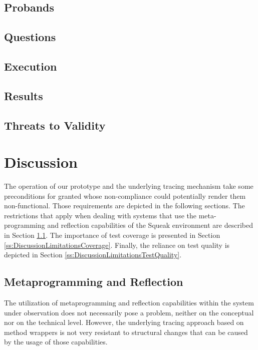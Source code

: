 \subsection{Probands}
\label{ss:DiscussionEvaluationParticipants}

\subsection{Questions}
\label{ss:DiscussionEvaluationQuestions}

\subsection{Execution}
\label{ss:DiscussionEvaluationExecution}

\subsection{Results}
\label{ss:DiscussionEvaluationResults}

\subsection{Threats to Validity}
\label{ss:DiscussionEvaluationThreats}

\clearpage
\section{Discussion}
\label{s:DiscussionLimitations}
The operation of our prototype and the underlying tracing mechanism take some preconditions for granted whose non-compliance could potentially render them non-functional.
Those requirements are depicted in the following sections.
The restrictions that apply when dealing with systems that use the meta-programming and reflection capabilities of the Squeak environment are described in Section \ref{ss:DiscussionLimitationsMeta}.
The importance of test coverage is presented in Section \ref{ss:DiscussionLimitationsCoverage}.
Finally, the reliance on test quality is depicted in Section \ref{ss:DiscussionLimitationsTestQuality}.

\subsection{Metaprogramming and Reflection}
\label{ss:DiscussionLimitationsMeta}
The utilization of metaprogramming and reflection capabilities within the system under observation does not necessarily pose a problem, neither on the conceptual nor on the technical level.
However, the underlying tracing approach based on method wrappers is not very resistant to structural changes that can be caused by the usage of those capabilities.

